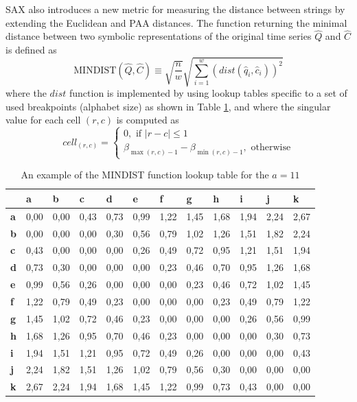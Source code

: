 SAX also introduces a new metric for measuring the distance between strings by extending the Euclidean and PAA \cite{citeulike:2946589} distances. 
The function returning the minimal distance between two symbolic representations of the original time series $\widehat{Q}$ and $\widehat{C}$ 
is defined as
\begin{equation}
\text{MINDIST}(\widehat{Q},\widehat{C}) \equiv \sqrt{ \frac{n}{w} } \sqrt{ \sum_{i=1}^{w} ( dist( \widehat{q}_{i}, \widehat{c}_{i} ) )^{2}}
\label{eq:sax_mindist}
\end{equation} 
where the $dist$ function is implemented by using lookup tables specific to a set of used breakpoints (alphabet size) as shown in 
Table \ref{tbl:sax_lookup}, and where the singular value for each cell $(r,c)$ is computed as 
\begin{equation}
cell_{(r,c)} = 
\begin{cases} 
0, \text{ if }\left| r-c \right| \leq 1 \\
\beta_{\max(r,c) - 1} - \beta_{\min(r,c) - 1}, \text{ otherwise}
\end{cases}
\label{eq:cell}
\end{equation}


\begin{table}
\caption{An example of the MINDIST function lookup table for the $a=11$}
\label{tbl:sax_lookup}
\small
\begin{tabularx}{\textwidth}{|l|X|X|X|X|X|X|X|X|X|X|X|}
\hline
&\textbf{a}&\textbf{b}&\textbf{c}&\textbf{d}&\textbf{e}&\textbf{f}&\textbf{g}&\textbf{h}&\textbf{i}&\textbf{j}&\textbf{k} \\
\hline
\textbf{a}& 0,00 & 0,00 & 0,43 & 0,73 & 0,99 & 1,22 & 1,45 & 1,68 & 1,94 & 2,24 & 2,67 \\
\hline
\textbf{b}& 0,00 & 0,00 & 0,00 & 0,30 & 0,56 & 0,79 & 1,02 & 1,26 & 1,51 & 1,82 & 2,24 \\
\hline
\textbf{c}& 0,43 & 0,00 & 0,00 & 0,00 & 0,26 & 0,49 & 0,72 & 0,95 & 1,21 & 1,51 & 1,94 \\ 
\hline
\textbf{d}& 0,73 & 0,30 & 0,00 & 0,00 & 0,00 & 0,23 & 0,46 & 0,70 & 0,95 & 1,26 & 1,68 \\ 
\hline
\textbf{e}& 0,99 & 0,56 & 0,26 & 0,00 & 0,00 & 0,00 & 0,23 & 0,46 & 0,72 & 1,02 & 1,45 \\ 
\hline
\textbf{f}& 1,22 & 0,79 & 0,49 & 0,23 & 0,00 & 0,00 & 0,00 & 0,23 & 0,49 & 0,79 & 1,22 \\ 
\hline
\textbf{g}& 1,45 & 1,02 & 0,72 & 0,46 & 0,23 & 0,00 & 0,00 & 0,00 & 0,26 & 0,56 & 0,99 \\ 
\hline
\textbf{h}& 1,68 & 1,26 & 0,95 & 0,70 & 0,46 & 0,23 & 0,00 & 0,00 & 0,00 & 0,30 & 0,73 \\ 
\hline
\textbf{i}& 1,94 & 1,51 & 1,21 & 0,95 & 0,72 & 0,49 & 0,26 & 0,00 & 0,00 & 0,00 & 0,43 \\ 
\hline
\textbf{j}& 2,24 & 1,82 & 1,51 & 1,26 & 1,02 & 0,79 & 0,56 & 0,30 & 0,00 & 0,00 & 0,00 \\ 
\hline
\textbf{k}& 2,67 & 2,24 & 1,94 & 1,68 & 1,45 & 1,22 & 0,99 & 0,73 & 0,43 & 0,00 & 0,00 \\ 
\hline
\end{tabularx}
\end{table}

